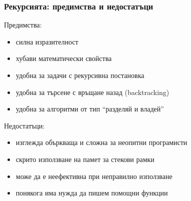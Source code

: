\documentclass[alsotrans]{beamerswitch}
\begin{document}
\begin{frame}
  \frametitle{Рекурсията: предимства и недостатъци}

  Предимства:
  \begin{itemize}[<+->]
  \item силна изразителност
  \item хубави математически свойства
  \item удобна за задачи с рекурсивна постановка
  \item удобна за търсене с връщане назад (backtracking)
  \item удобна за алгоритми от тип ``разделяй и владей''
  \end{itemize}
  \onslide<+->
  Недостатъци:
  \begin{itemize}[<+->]
  \item изглежда объркваща и сложна за неопитни програмисти
  \item скрито използване на памет за стекови рамки
  \item може да е неефективна при неправилно използване
  \item понякога има нужда да пишем помощни функции
  \end{itemize}
\end{frame}
\end{document}
